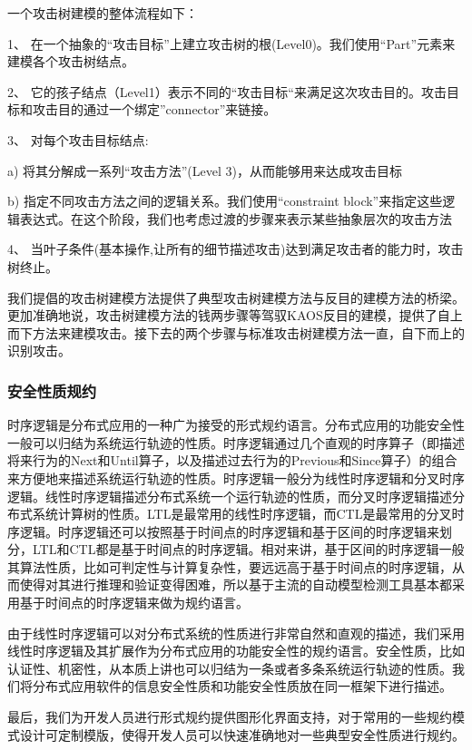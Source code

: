 \par
一个攻击树建模的整体流程如下：
\par
1、	在一个抽象的“攻击目标”上建立攻击树的根(Level0)。我们使用“Part”元素来建模各个攻击树结点。
\par
2、	它的孩子结点（Level1）表示不同的“攻击目标“来满足这次攻击目的。攻击目标和攻击目的通过一个绑定”connector”来链接。
\par
3、	对每个攻击目标结点:
\par
a)	将其分解成一系列“攻击方法”(Level 3)，从而能够用来达成攻击目标
\par
b)	指定不同攻击方法之间的逻辑关系。我们使用“constraint block”来指定这些逻辑表达式。在这个阶段，我们也考虑过渡的步骤来表示某些抽象层次的攻击方法
\par
4、	当叶子条件(基本操作,让所有的细节描述攻击)达到满足攻击者的能力时，攻击树终止。
\par
我们提倡的攻击树建模方法提供了典型攻击树建模方法与反目的建模方法的桥梁。更加准确地说，攻击树建模方法的钱两步骤等驾驭KAOS反目的建模，提供了自上而下方法来建模攻击。接下去的两个步骤与标准攻击树建模方法一直，自下而上的识别攻击。
\subsubsection{安全性质规约}
\par
时序逻辑是分布式应用的一种广为接受的形式规约语言。分布式应用的功能安全性一般可以归结为系统运行轨迹的性质。时序逻辑通过几个直观的时序算子（即描述将来行为的Next和Until算子，以及描述过去行为的Previous和Since算子）的组合来方便地来描述系统运行轨迹的性质。时序逻辑一般分为线性时序逻辑和分叉时序逻辑。线性时序逻辑描述分布式系统一个运行轨迹的性质，而分叉时序逻辑描述分布式系统计算树的性质。LTL是最常用的线性时序逻辑，而CTL是最常用的分叉时序逻辑。时序逻辑还可以按照基于时间点的时序逻辑和基于区间的时序逻辑来划分，LTL和CTL都是基于时间点的时序逻辑。相对来讲，基于区间的时序逻辑一般其算法性质，比如可判定性与计算复杂性，要远远高于基于时间点的时序逻辑，从而使得对其进行推理和验证变得困难，所以基于主流的自动模型检测工具基本都采用基于时间点的时序逻辑来做为规约语言。
\par
由于线性时序逻辑可以对分布式系统的性质进行非常自然和直观的描述，我们采用线性时序逻辑及其扩展作为分布式应用的功能安全性的规约语言。安全性质，比如认证性、机密性，从本质上讲也可以归结为一条或者多条系统运行轨迹的性质。我们将分布式应用软件的信息安全性质和功能安全性质放在同一框架下进行描述。
\par
最后，我们为开发人员进行形式规约提供图形化界面支持，对于常用的一些规约模式设计可定制模版，使得开发人员可以快速准确地对一些典型安全性质进行规约。